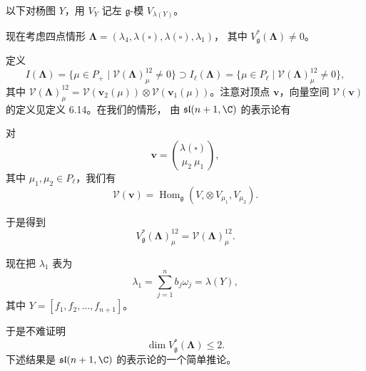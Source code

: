 以下对杨图 $Y$，用 $V_Y$ 记左 $\mathfrak{g}$-模 $V_{\lambda(Y)}$。

现在考虑四点情形 $\mathbf{\Lambda}=(\lambda_4,\lambda(\square),\lambda(\square),\lambda_1)$，
其中 $V_{\mathfrak{g}}^*(\mathbf{\Lambda})\neq0$。


定义
\[
I(\mathbf{\Lambda})=\{\mu\in P_+\mid\mathcal V(\mathbf{\Lambda})_\mu^{12}\neq0\}
\supset I_\ell(\mathbf{\Lambda})
=\{\mu\in P_\ell\mid\mathcal V(\mathbf{\Lambda})_\mu^{12}\neq0\},
\]
其中 $\mathcal V(\mathbf{\Lambda})_\mu^{12}
=\mathcal V(\mathbf{v}_2(\mu))\otimes\mathcal V(\mathbf{v}_1(\mu))$。注意对顶点
$\mathbf{v}$，向量空间 $\mathcal V(\mathbf{v})$ 的定义见定义 6.14。在我们的情形，
由 $\mathfrak{sl}(n+1,\C)$ 的表示论有

\begin{proposition}[6.21]
对
\[
\mathbf{v}=\binom{\lambda(\square)}{\mu_2\ \mu_1},
\]
其中 $\mu_1,\mu_2\in P_\ell$，我们有
\[
\mathcal V(\mathbf{v})
=\operatorname{Hom}_{\mathfrak{g}}(V_{\square}\otimes V_{\mu_1},V_{\mu_2}).
\]
\end{proposition}

于是得到
\[
V_{\mathfrak{g}}^*(\mathbf{\Lambda})_\mu^{12}
=\mathcal V(\mathbf{\Lambda})_\mu^{12}.
\]

现在把 $\lambda_1$ 表为
\[
\lambda_1=\sum_{j=1}^n b_j\omega_j=\lambda(Y),
\]
其中 $Y=[f_1,f_2,\dots,f_{n+1}]$。

于是不难证明
\[
\dim V_{\mathfrak{g}}^*(\mathbf{\Lambda})\le2.
\]
下述结果是 $\mathfrak{sl}(n+1,\C)$ 的表示论的一个简单推论。

